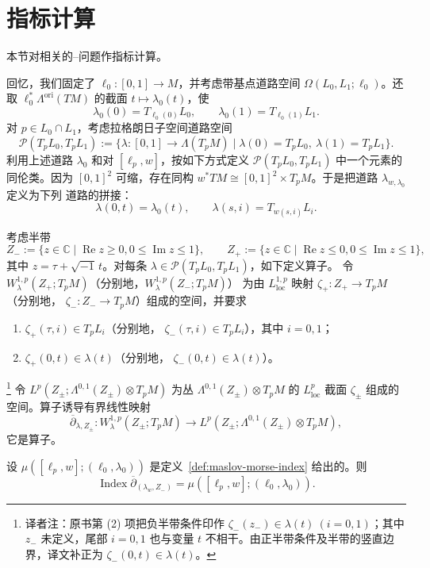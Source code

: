 \section{指标计算}
\label{sec:ch15-index-calculation}

本节对相关的\personRiemann{}--\personHilbert{}问题作指标计算。

回忆，我们固定了\termBasePath{} $\ell_0:[0,1]\to M$，并考虑带基点道路空间
$\Omega(L_0,L_1;\ell_0)$。还取 $\ell_0^*\Lambda^{\mathrm{ori}}(TM)$ 的截面
$t\mapsto\lambda_0(t)$，使
\[
 \lambda_0(0)=T_{\ell_0(0)}L_0,
 \qquad
 \lambda_0(1)=T_{\ell_0(1)}L_1.
\]
对 $p\in L_0\cap L_1$，考虑拉格朗日子空间道路空间
\[
 \mathcal P(T_pL_0,T_pL_1)
 :=\{\lambda:[0,1]\to\Lambda(T_pM)\mid
 \lambda(0)=T_pL_0,\ \lambda(1)=T_pL_1\}.
\]
利用上述道路 $\lambda_0$ 和对 $[\ell_p,w]$，按如下方式定义
$\mathcal P(T_pL_0,T_pL_1)$ 中一个元素的同伦类。因为 $[0,1]^2$ 可缩，存在同构
$w^*TM\cong[0,1]^2\times T_pM$。于是把道路 $\lambda_{w,\lambda_0}$ 定义为下列
道路的拼接：
\[
 \lambda(0,t)=\lambda_0(t),
 \qquad
 \lambda(s,i)=T_{w(s,i)}L_i.
\]

考虑半带
\[
 Z_-:=\{z\in\mathbb C\mid\operatorname{Re}z\geq0,
 0\leq\operatorname{Im}z\leq1\},
 \qquad
 Z_+:=\{z\in\mathbb C\mid\operatorname{Re}z\leq0,
 0\leq\operatorname{Im}z\leq1\},
\]
其中 $z=\tau+\sqrt{-1}\,t$。对每条
$\lambda\in\mathcal P(T_pL_0,T_pL_1)$，如下定义\personFredholm{}算子。
令 $W_\lambda^{1,p}(Z_+;T_pM)$（分别地，$W_\lambda^{1,p}(Z_-;T_pM)$）
为由 $L_{\mathrm{loc}}^{1,p}$ 映射 $\zeta_+:Z_+\to T_pM$（分别地，
$\zeta_-:Z_-\to T_pM$）组成的\personBanach{}空间，并要求
\begin{enumerate}[label=(\arabic*)]
\item $\zeta_+(\tau,i)\in T_pL_i$（分别地，
$\zeta_-(\tau,i)\in T_pL_i$），其中 $i=0,1$；
\item $\zeta_+(0,t)\in\lambda(t)$（分别地，
$\zeta_-(0,t)\in\lambda(t)$）。
\end{enumerate}
\footnote{译者注：原书第 (2) 项把负半带条件印作
$\zeta_-(z_-)\in\lambda(t)\ (i=0,1)$；其中 $z_-$ 未定义，尾部 $i=0,1$
也与变量 $t$ 不相干。由正半带条件及半带的竖直边界，译文补正为
$\zeta_-(0,t)\in\lambda(t)$。}
令 $L^p(Z_\pm;\Lambda^{0,1}(Z_\pm)\otimes T_pM)$ 为丛
$\Lambda^{0,1}(Z_\pm)\otimes T_pM$ 的 $L_{\mathrm{loc}}^p$ 截面 $\zeta_\pm$
组成的\personBanach{}空间。\personDolbeault{}算子诱导有界线性映射
\[
 \overline\partial_{\lambda,Z_\pm}:
 W_\lambda^{1,p}(Z_\pm;T_pM)
 \longrightarrow L^p(Z_\pm;\Lambda^{0,1}(Z_\pm)\otimes T_pM),
\]
它是\personFredholm{}算子。

\begin{proposition}
\label{prop:semi-strip-index-maslov-morse}
设 $\mu([\ell_p,w];(\ell_0,\lambda_0))$ 是定义~\ref{def:maslov-morse-index}
给出的\termMaslovMorseIndex{}。则
\begin{equation}
 \operatorname{Index}\overline\partial_{(\lambda_w,Z_-)}
 =\mu([\ell_p,w];(\ell_0,\lambda_0)).
 \label{eq:semi-strip-index-maslov-morse}
\end{equation}
\end{proposition}

